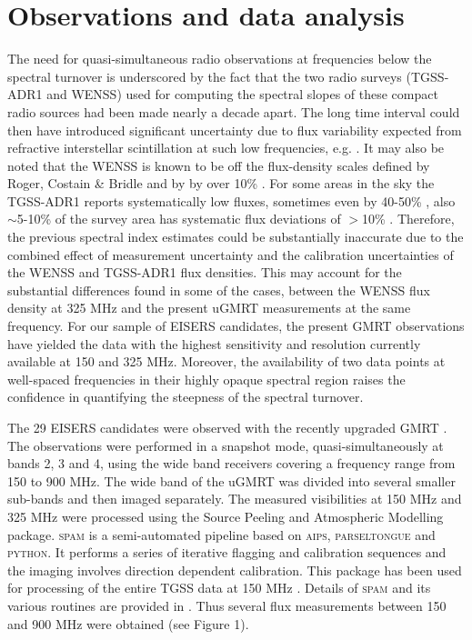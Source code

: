 \documentclass[proof]{WileyASNA-v1}
\begin{document}
\section{Observations and data analysis}\label{sec4}
The need for quasi-simultaneous radio observations at frequencies below the spectral turnover is underscored by the fact that the two radio surveys (TGSS-ADR1 and WENSS) used for computing the spectral slopes of these compact radio sources had been made nearly a decade apart. The long time interval could then have introduced significant uncertainty due to flux variability expected from refractive interstellar scintillation at such low frequencies, e.g. \citep{Bell2018}. It may also be noted that the WENSS \citep{Rengelink1997} is known to be off the flux-density scales defined by Roger, Costain \& Bridle \citep[RCB,][]{Roger1973} and by \citet{Baars1977} by over 10\% \citep[see,][]{Hardcastle2016}. For some areas in the sky the TGSS-ADR1 reports systematically low fluxes, sometimes even by 40-50\% , also $\sim$5-10\% of the survey area has systematic flux deviations of $>$10\% \citep{Intema2017}. Therefore, the previous spectral index estimates could be substantially inaccurate due to the combined effect of measurement uncertainty and the calibration uncertainties of the WENSS and TGSS-ADR1 flux densities. This may account for the substantial differences found in some of the cases, between the WENSS flux density at 325 MHz and the present uGMRT measurements at the same frequency. For our sample of EISERS candidates, the present GMRT observations have yielded the data with the highest sensitivity and resolution currently available at 150 and 325 MHz. Moreover, the availability of two data points at well-spaced frequencies in their highly opaque spectral region raises the confidence in quantifying the steepness of the spectral turnover. 

The 29 EISERS candidates were observed with the recently upgraded GMRT \citep[`uGMRT',][]{Gupta2017}. The observations were performed in a snapshot mode, quasi-simultaneously at bands 2, 3 and 4, using the wide band receivers covering a frequency range from 150 to 900 MHz. The wide band of the uGMRT was divided into several smaller sub-bands and then imaged separately. The measured visibilities at 150 MHz and 325 MHz were processed using the Source Peeling and Atmospheric Modelling \citep[\textsc{spam}][]{Intema2014} package. \textsc{spam} is a semi-automated pipeline based on \textsc{aips}, \textsc{parseltongue} and \textsc{python}. It performs a series of iterative flagging and calibration sequences and the imaging involves direction dependent calibration. This package has been used for processing of the entire TGSS data at 150 MHz \citep{Intema2017}. Details of \textsc{spam} and its various routines are provided in \citet{Intema2017}. Thus several flux measurements between 150 and 900 MHz were obtained (see Figure 1). 
\end{document}
